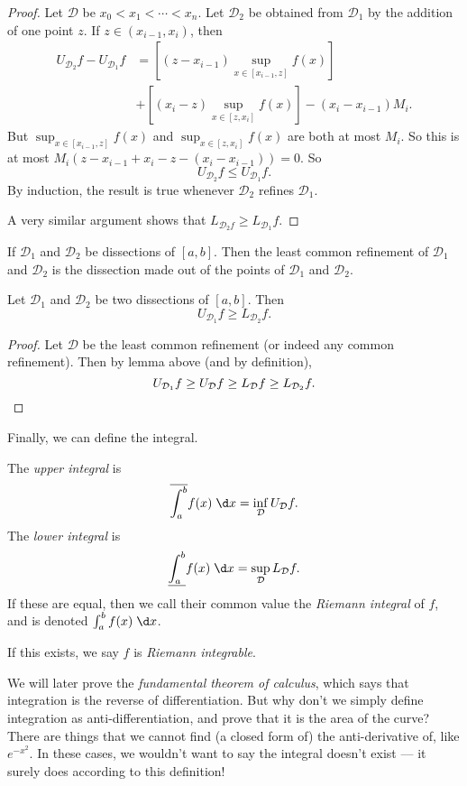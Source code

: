 \documentclass[a4paper]{article}
\begin{document}
\begin{proof}
  Let $\mathcal{D}$ be $x_0 < x_1 < \cdots < x_n$. Let $\mathcal{D}_2$ be obtained from $\mathcal{D}_1$ by the addition of one point $z$. If $z\in (x_{i - 1}, x_i)$, then
  \begin{align*}
    U_{\mathcal{D}_2}f - U_{\mathcal{D}_1}f &= \left[(z - x_{i - 1}) \sup_{x\in [x_{i - 1}, z]} f(x)\right]\\
    &+ \left[(x_i - z)\sup_ {x\in[z, x_i]}f(x)\right] - (x_i - x_{i - 1})M_i.
  \end{align*}
  But $\sup_{x\in [x_{i - 1}, z]} f(x)$ and $\sup_{x\in [z, x_i]} f(x)$ are both at most $M_i$. So this is at most $M_i( z - x_{i - 1} + x_i - z - (x_i - x_{i - 1})) =0 $. So
  \[
    U_{\mathcal{D}_2} f\leq U_{\mathcal{D}_1}f.
  \]
  By induction, the result is true whenever $\mathcal{D}_2$ refines $\mathcal{D}_1$.

  A very similar argument shows that $L_{\mathcal{D}_2f} \geq L_{\mathcal{D}_1}f$.
\end{proof}
\begin{defi}
  If $\mathcal{D}_1$ and $\mathcal{D}_2$ be dissections of $[a, b]$. Then the least common refinement of $\mathcal{D}_1$ and $\mathcal{D}_2$ is the dissection made out of the points of $\mathcal{D}_1$ and $\mathcal{D}_2$.
\end{defi}

\begin{cor}
  Let $\mathcal{D}_1$ and $\mathcal{D}_2$ be two dissections of $[a, b]$. Then
  \[
    U_{\mathcal{D}_1}f \geq L_{\mathcal{D}_2}f.
  \]
\end{cor}
\begin{proof}
  Let $\mathcal{D}$ be the least common refinement (or indeed any common refinement). Then by lemma above (and by definition),
  \[
    U_{\mathcal{D}_1}f \geq U_{\mathcal{D}}f \geq L_{\mathcal{D}}f \geq L_{\mathcal{D}_2}f.\qedhere
  \]
\end{proof}

Finally, we can define the integral.
\begin{defi}
  The \emph{upper integral} is
  \[
    \overline{\int_a^b} f(x)\;\d x = \inf_{\mathcal{D}}U_{\mathcal{D}}f.
  \]
  The \emph{lower integral} is
  \[
    \underline{\int_a^b} f(x)\;\d x = \sup_{\mathcal{D}}L_{\mathcal{D}}f.
  \]
  If these are equal, then we call their common value the \emph{Riemann integral} of $f$, and is denoted $\int_a^b f(x)\;\d x$.

  If this exists, we say $f$ is \emph{Riemann integrable}.
\end{defi}
We will later prove the \emph{fundamental theorem of calculus}, which says that integration is the reverse of differentiation. But why don't we simply define integration as anti-differentiation, and prove that it is the area of the curve? There are things that we cannot find (a closed form of) the anti-derivative of, like $e^{-x^2}$. In these cases, we wouldn't want to say the integral doesn't exist --- it surely does according to this definition!
\end{document}
